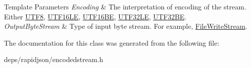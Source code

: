 \begin{DoxyTemplParams}{Template Parameters}
{\em Encoding} & The interpretation of encoding of the stream. Either \hyperlink{struct_u_t_f8}{U\+T\+F8}, \hyperlink{struct_u_t_f16_l_e}{U\+T\+F16\+LE}, \hyperlink{struct_u_t_f16_b_e}{U\+T\+F16\+BE}, \hyperlink{struct_u_t_f32_l_e}{U\+T\+F32\+LE}, \hyperlink{struct_u_t_f32_b_e}{U\+T\+F32\+BE}. \\
\hline
{\em Output\+Byte\+Stream} & Type of input byte stream. For example, \hyperlink{class_file_write_stream}{File\+Write\+Stream}. \\
\hline
\end{DoxyTemplParams}


The documentation for this class was generated from the following file\+:\begin{DoxyCompactItemize}
\item 
deps/rapidjson/encodedstream.\+h\end{DoxyCompactItemize}
